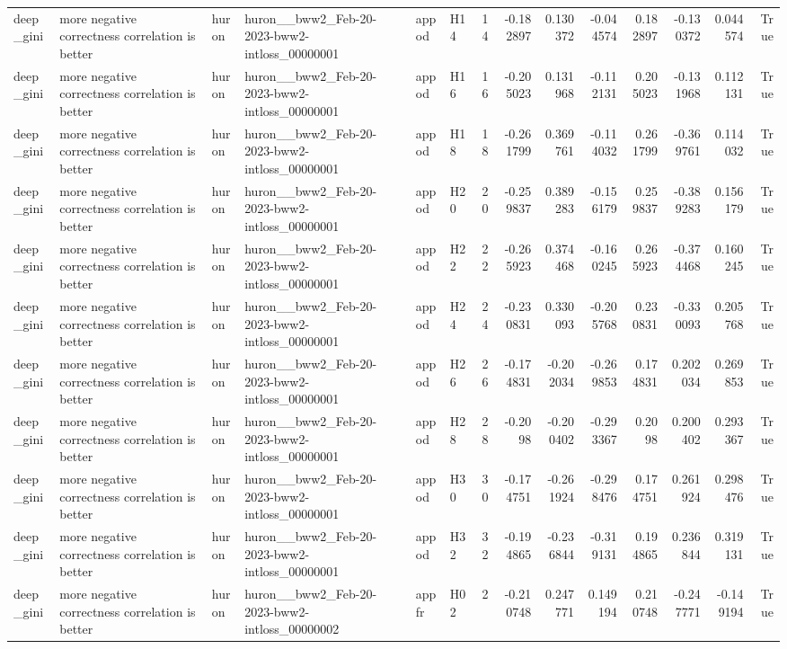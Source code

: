 \begin{longtable}{llllllrrrrrrrr}
deep\_gini & more negative correctness correlation is better & huron & huron\_\_bww2\_Feb-20-2023-bww2-intloss\_00000001 & appod & H14 & 14 & -0.182897 & 0.130372 & -0.044574 & 0.182897 & -0.130372 & 0.044574 & True \\
deep\_gini & more negative correctness correlation is better & huron & huron\_\_bww2\_Feb-20-2023-bww2-intloss\_00000001 & appod & H16 & 16 & -0.205023 & 0.131968 & -0.112131 & 0.205023 & -0.131968 & 0.112131 & True \\
deep\_gini & more negative correctness correlation is better & huron & huron\_\_bww2\_Feb-20-2023-bww2-intloss\_00000001 & appod & H18 & 18 & -0.261799 & 0.369761 & -0.114032 & 0.261799 & -0.369761 & 0.114032 & True \\
deep\_gini & more negative correctness correlation is better & huron & huron\_\_bww2\_Feb-20-2023-bww2-intloss\_00000001 & appod & H20 & 20 & -0.259837 & 0.389283 & -0.156179 & 0.259837 & -0.389283 & 0.156179 & True \\
deep\_gini & more negative correctness correlation is better & huron & huron\_\_bww2\_Feb-20-2023-bww2-intloss\_00000001 & appod & H22 & 22 & -0.265923 & 0.374468 & -0.160245 & 0.265923 & -0.374468 & 0.160245 & True \\
deep\_gini & more negative correctness correlation is better & huron & huron\_\_bww2\_Feb-20-2023-bww2-intloss\_00000001 & appod & H24 & 24 & -0.230831 & 0.330093 & -0.205768 & 0.230831 & -0.330093 & 0.205768 & True \\
deep\_gini & more negative correctness correlation is better & huron & huron\_\_bww2\_Feb-20-2023-bww2-intloss\_00000001 & appod & H26 & 26 & -0.174831 & -0.202034 & -0.269853 & 0.174831 & 0.202034 & 0.269853 & True \\
deep\_gini & more negative correctness correlation is better & huron & huron\_\_bww2\_Feb-20-2023-bww2-intloss\_00000001 & appod & H28 & 28 & -0.2098 & -0.200402 & -0.293367 & 0.2098 & 0.200402 & 0.293367 & True \\
deep\_gini & more negative correctness correlation is better & huron & huron\_\_bww2\_Feb-20-2023-bww2-intloss\_00000001 & appod & H30 & 30 & -0.174751 & -0.261924 & -0.298476 & 0.174751 & 0.261924 & 0.298476 & True \\
deep\_gini & more negative correctness correlation is better & huron & huron\_\_bww2\_Feb-20-2023-bww2-intloss\_00000001 & appod & H32 & 32 & -0.194865 & -0.236844 & -0.319131 & 0.194865 & 0.236844 & 0.319131 & True \\
deep\_gini & more negative correctness correlation is better & huron & huron\_\_bww2\_Feb-20-2023-bww2-intloss\_00000002 & appfr & H02 & 2 & -0.210748 & 0.247771 & 0.149194 & 0.210748 & -0.247771 & -0.149194 & True \\

\end{longtable}
